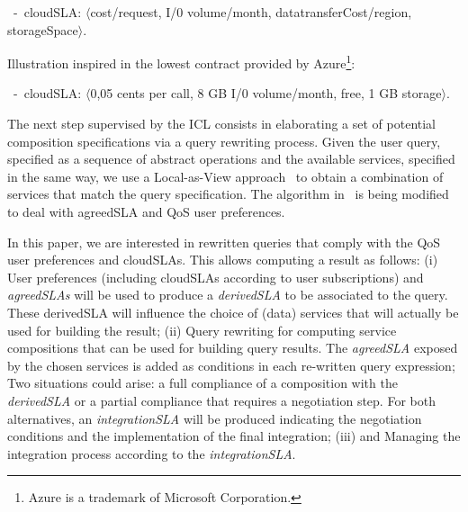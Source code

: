 \begin{trivlist}\sf\footnotesize
 \item[~-~cloudSLA:]  $\langle$cost/request, I/0 volume/month, datatransferCost/region, storageSpace$\rangle$.
 \end{trivlist}
 
Illustration inspired in the lowest contract provided by Azure\footnote{Azure is a trademark of Microsoft Corporation.}: 
 \begin{trivlist}\sf\footnotesize
\item[~-~cloudSLA:]  $\langle$0,05 cents per call, 8 GB I/0 volume/month, free, 1 GB storage$\rangle$. 
\end{trivlist}


 

   
 


The next step supervised by the ICL consists in elaborating a set of potential composition specifications via a query rewriting process. Given the user query, specified as a sequence of abstract operations and the available services, specified in the same way, we use a Local-as-View approach~\cite{CostaAMR13} to obtain a combination of services that match the query specification.
The algorithm in~\cite{CostaAMR13} is being modified to deal with agreedSLA and QoS user preferences.

 

In this paper, we are interested in rewritten queries that comply with the QoS user preferences and cloudSLAs.
 This allows computing a result as follows: (i) User preferences (including cloudSLAs according to user subscriptions) and \textit{agreedSLAs} will be used to produce a \textit{derivedSLA} to be associated to the query. These derivedSLA will influence the choice of (data) services that will actually be used for building the result; (ii) Query rewriting for computing service compositions that can be used for  building query results. The \textit{agreedSLA} exposed by the chosen services is added as  conditions in  each re-written query expression; Two situations could arise: a full compliance of a composition with the \textit{derivedSLA} or a partial compliance that requires a negotiation step. For both alternatives, an \textit{integrationSLA} will be produced indicating the negotiation conditions and the implementation of the final integration; (iii) and Managing the integration process according to the \textit{integrationSLA}.

